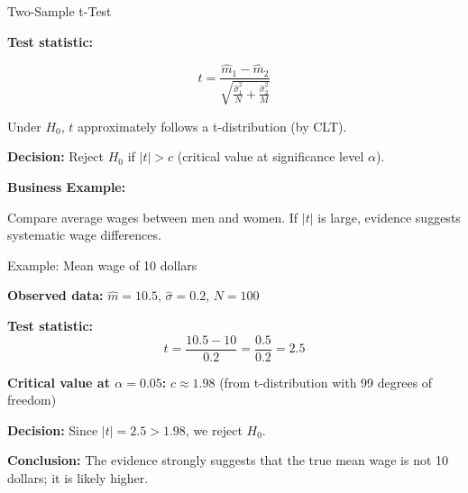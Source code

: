 \documentclass{beamer}
\begin{document}
\begin{frame}{Two-Sample t-Test}

\textbf{Test statistic:}

\[
t = \frac{\hat{m}_1 - \hat{m}_2}{\sqrt{\frac{\hat{\sigma}_1^2}{N} + \frac{\hat{\sigma}_2^2}{M}}}
\]

\vspace{0.3cm}

Under $H_0$, $t$ approximately follows a t-distribution (by CLT).

\vspace{0.3cm}

\textbf{Decision:} Reject $H_0$ if $|t| > c$ (critical value at significance level $\alpha$).

\vspace{0.3cm}

\textbf{Business Example:}

Compare average wages between men and women.  
If $|t|$ is large, evidence suggests systematic wage differences.

\end{frame}

\begin{frame}{Example: Mean wage of 10 dollars}

\textbf{Observed data:} $\hat{m} = 10.5$, $\hat{\sigma} = 0.2$, $N = 100$

\medskip

\textbf{Test statistic:}
\[ t = \frac{10.5 - 10}{0.2} = \frac{0.5}{0.2} = 2.5 \]

\medskip

\textbf{Critical value at $\alpha = 0.05$:} $c \approx 1.98$ (from t-distribution with 99 degrees of freedom)

\medskip

\textbf{Decision:} Since $|t| = 2.5 > 1.98$, we reject $H_0$.

\medskip

\textbf{Conclusion:} The evidence strongly suggests that the true mean wage is not 10 dollars; it is likely higher.

\end{frame}
\end{document}
